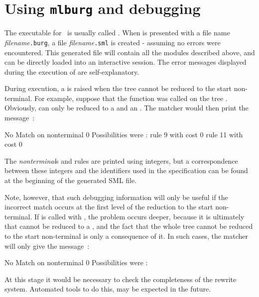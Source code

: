 	\section{Using {\tt mlburg} and debugging}

The executable for \mlburg\ is usually called .  When  is
presented with a file name {\em filename}{\tt .burg}, a file {\em
filename}{\tt .sml} is created - assuming no errors were encountered. This
generated file will contain all the modules described above, and can be
directly loaded into an interactive session.  The error messages displayed
during the execution of  are self-explanatory.

During execution, a  is raised when the tree cannot be reduced
to the start non-terminal.  For example, suppose that the function
 was called on the tree .  Obviously,  can
only be reduced to a  and an .  The matcher would then print
the message~:
\begin{code}
    No Match on nonterminal 0
    Possibilities were :
    rule 9 with cost 0
    rule 11 with cost 0
\end{code}
The {\sl nonterminal}s and rules are printed using integers, but a
correspondence between these integers and the identifiers used in the
specification can be found at the beginning of the generated SML file.

Note, however, that such debugging information will only be useful if the
incorrect match occurs at the first level of the reduction to the start
non-terminal.  If  is called with , the
problem occurs deeper, because it is ultimately  that cannot be
reduced to a , and the fact that the whole tree cannot be reduced
to the start non-terminal is only a consequence of it.  In such cases, the
matcher will only give the message~:
\begin{code}
    No Match on nonterminal 0
    Possibilities were : 
\end{code}
At this stage it would be necessary to check the completeness of the
rewrite system. Automated tools to do this, may be expected in the
future\cite{emmelmann-92}. 




